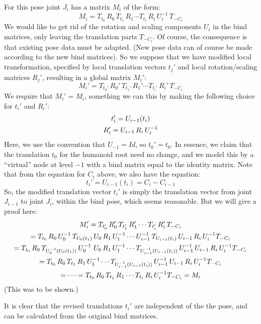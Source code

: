 For this pose joint $J_i$ has a matrix $M_i$ of the form:
%
\[ M_i = T_{t_0}\, R_0\, T_{t_1}\, R_1 \cdots T_{t_i}\, R_i\, U_i^{-1}\, T_{-C_i}\]
%
We would like to get rid of the rotation and scaling components $U_i$ in the bind matrices,
only leaving the translation parts $T_{-C_i}$.
Of course, the consequence is that existing pose data must be adapted.
(New pose data can of course be made according to the new bind matrices).
So we suppose that we have modified local transformation, specified by local translation vectors
$t_j'$ and local rotation/scaling matrices $R_j'$, resulting in a global matrix $M_i'$:
%
\[ M_i' = T_{t_0'}\, R_0'\, T_{t_1'}\, R_1' \cdots T_{t_i'}\, R_i'\, T_{-C_i}\]
%
We require that $M_i' = M_i$, something we
can this by making the following choice for $t_i'$ and $R_i'$:
%
\begin{gather}
t_i'= U_{i-1}(t_i)\notag\\
 R_i' = U_{i-1}\,R_i\,U_i^{-1}\notag
\end{gather}
Here, we use the convention that $U_{-1} = Id$, so $t_0' = t_0$.
In essence, we claim that the translation $t_0$ for the humanoid root need no change,
and we model this by a ``virtual'' node at level $-1$ with a bind matrix equal to the identity matrix.
Note that from the equation for $C_i$ above, we also have the equation:
\[ t_i' = U_{i-1}(t_i) = C_i - C_{i-1}\]
%
So, the modified translation vector $t_i'$ is simply the translation vector from joint $J_{i-1}$ to joint $J_i$,
within the bind pose, which seems reasonable.
But we will give a proof here:
%
\begin{gather}
 M_i' = T_{t_0'}\, R_0'\, T_{t_1'}\, R_1' \cdots T_{t_i'}\, R_i'\, T_{-C_i}\notag\\
 = T_{t_0}\,R_0\,U_0^{-1}\,T_{U_0(t_1)}\,U_0\,R_1\,U_1^{-1} \cdots U_{i-1}^{-1}\,T_{U_{i-1}(t_i)}\,U_{i-1}\,R_i\,U_{i}^{-1}T_{-C_i}\notag\\
 = T_{t_0}\,R_0\,T_{U_0^{-1}(U_0(t_1))}\,U_0^{-1}\,\,U_0\,R_1 \,U_1^{-1}
  \cdots T_{U_{i-1}^{-1}(U_{i-1}(t_i))}\, U_{i-1}^{-1}\, U_{i-1}\,R_i\,U_{i}^{-1}T_{-C_i}\notag\\
  = T_{t_0}\,R_0\,T_{t_1}\,R_1 \,U_1^{-1} \cdots T_{U_{i-1}^{-1}(U_{i-1}(t_i))}\, U_{i-1}^{-1}\, U_{i-1}\,R_i\,U_{i}^{-1}T_{-C_i}\notag\\
  = \cdots = T_{t_0}\,R_0\,T_{t_1}\,R_1 \cdots T_{t_i}\,R_i\,U_{i}^{-1}T_{-C_i}  = M_i\notag
\end{gather}
(This was to be shown.)

It is clear that the revised translations $t_i'$ are independent of the the pose, and can be
calculated from the original bind matrices.

